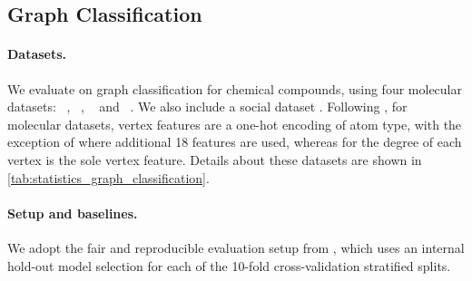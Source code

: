 \begin{table}[ht]
    \centering
    \caption{Training runtime per epoch in seconds.}
    \label{tab:runtime}
\end{table}

\subsection{Graph Classification}
\paragraph{Datasets.} We evaluate \model{} on graph classification for chemical compounds, using four molecular datasets: \dd{}~\citep{Dobson2003-dd}, \proteins{}~\citep{Borgwardt2005-proteins}, \nci{}~\citep{Wale2008-nci1} and \enzymes{}~\citep{Schomburg2004-enzymes}. We also include a social dataset \imdbb{}. Following \citet{errica2019fair}, for molecular datasets, vertex features are a one-hot encoding of atom type, with the exception of \enzymes{} where additional 18 features are used, whereas for \imdbb{} the degree of each vertex is the sole vertex feature.
Details about these datasets are shown in \cref{tab:statistics_graph_classification}.

\paragraph{Setup and baselines.} 
We adopt the fair and reproducible evaluation setup from \citet{errica2019fair}, which uses an internal hold-out model selection for each of the 10-fold cross-validation stratified splits. 

